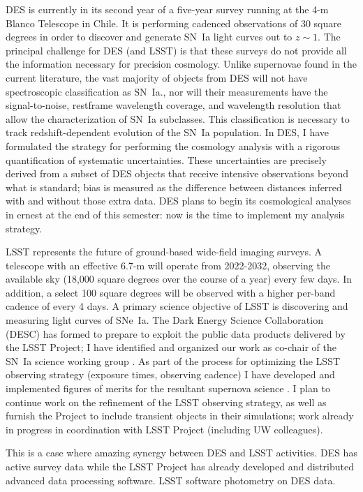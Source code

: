 \documentclass{article}
\begin{document}
DES is currently in its second year of a five-year survey running at the 4-m Blanco Telescope in Chile.  It is performing
cadenced observations of 30 square degrees in order to discover and generate SN~Ia light curves out
to $z\sim1$.
The principal challenge for DES (and LSST) is that these surveys do
not provide all the information necessary for precision cosmology.
Unlike  supernovae found in the current literature, the vast majority of objects from DES
will not have spectroscopic classification as SN~Ia., nor will their
measurements have the signal-to-noise, restframe wavelength coverage, and wavelength resolution that allow 
the characterization of SN~Ia subclasses.  This classification is necessary to track redshift-dependent evolution of 
the SN~Ia population.  In DES, I have formulated the strategy for performing the cosmology analysis
with a rigorous quantification of systematic uncertainties.  These uncertainties are precisely derived from a subset of 
DES objects that receive intensive observations beyond what is standard;
bias is measured as the difference between distances inferred with
and without those extra data. 
DES plans to begin its cosmological analyses in ernest at the end
of this semester: now is the time to implement my analysis strategy.

LSST  represents the future of ground-based wide-field imaging surveys.
A telescope with an effective 6.7-m will operate from 2022-2032, observing the available sky (18,000 square degrees over the course
of a year)
every few days.  In addition, a select 100 square degrees will be observed with a higher per-band cadence of every 4 days.
A primary science objective of LSST is discovering and measuring light curves of SNe~Ia.
The Dark Energy Science Collaboration (DESC) has formed to prepare
to exploit  the public data products
delivered by the  LSST Project;  I have identified and organized
our work as co-chair of the SN~Ia science working group \cite{2012arXiv1211.0310L}.
As part of the process for optimizing the LSST observing strategy (exposure times,
observing cadence) I have developed and implemented figures of merits for the resultant supernova science
\cite{Cadence workshop}.  I plan to continue work on the refinement of the LSST observing strategy,
as well as furnish the Project to include transient objects in their simulations; work already in progress
in coordination with LSST Project (including UW colleagues).

This is a case where 
amazing synergy between DES and LSST activities.  DES has active survey data
while the LSST Project has already developed and distributed advanced data processing
software.  LSST software photometry on
DES data.
\end{document}

